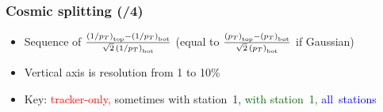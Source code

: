 \documentclass[compress]{beamer}
\begin{document}
\begin{frame}
\frametitle{Cosmic splitting (/4)}

\begin{itemize}
\item Sequence of $\frac{\left(1/p_T\right)_{\mbox{\tiny top}} - \left(1/p_T\right)_{\mbox{\tiny bot}}}{\sqrt{2} \, \left(1/p_T\right)_{\mbox{\tiny bot}}}$ (equal to $\frac{\left(p_T\right)_{\mbox{\tiny top}} - \left(p_T\right)_{\mbox{\tiny bot}}}{\sqrt{2} \, \left(p_T\right)_{\mbox{\tiny bot}}}$ if Gaussian)
\item Vertical axis is resolution from 1 to 10\%
\item Key: \textcolor{red}{tracker-only,} sometimes with station~1, \textcolor{darkgreen}{with station~1,} \mbox{\textcolor{blue}{all stations}\hspace{-1 cm}}
\end{itemize}

\mbox{ } \hfill {} \hfill \mbox{ }


\end{frame}
\end{document}

